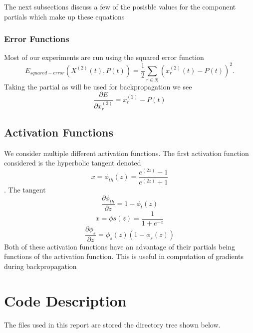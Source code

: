 \documentclass{article}
\begin{document}
The next subsections discuss a few of the posisble values for the component partials which make up these equations

\subsubsection{Error Functions}\label{error}
Most of our experiments are run using the squared error function
\begin{equation}
E_{squared-error}(X^{(2)}(t), P(t)) =  \frac{1}{2}\sum_{r\in\mathcal{R}}(x^{(2)}_{r}(t)-P(t))^2.
\end{equation}
Taking the partial as will be used for backpropagation we see
\begin{equation}
\frac{\partial E}{\partial x_r^{(2)}}= x^{(2)}_{r}-P(t)
\end{equation}

\subsection{Activation Functions}\label{activation}
We consider multiple different activation functions.
The first activation function considered is the hyperbolic tangent denoted
\begin{equation}
x = \phi_{th}(z) = \frac{e^{(2z)}-1}{e^{(2z)}+1}
\end{equation}.
The tangent
\begin{equation}
\frac{\partial \phi_{th}}{\partial z} = 1 - \phi_{t}(z)
\end{equation}
\begin{equation}
x = \phi{s}(z) = \frac{1}{1+e^{-z}}
\end{equation}
\begin{equation}
\frac{\partial \phi_{s}}{\partial z} = \phi_{s}(z)(1-\phi_{s}(z))
\end{equation}
Both of these activation functions have an advantage of their partials being functions of the activation function.  This is useful in computation of gradients during backpropagation 

\pagebreak
\section{Code Description}
The files used in this report are stored the directory tree shown below.
\end{document}
